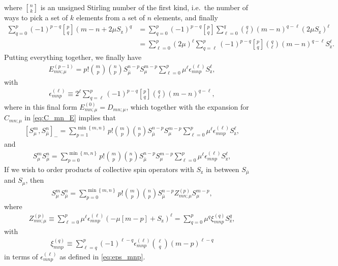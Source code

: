\documentclass[aps,notitlepage,nofootinbib,11pt]{revtex4-1}
\newcommand{\p}[1]{\left(#1\right)} %
\renewcommand{\sp}[1]{\left[#1\right]} %
\renewcommand{\set}[1]{\left\{#1\right\}} %
\newcommand{\z}{\text{z}}
\newcommand{\bmu}{{\bar\mu}}
\newcommand{\1}{\mathds{1}}
\begin{document}
where ${ n \brack k }$ is an unsigned Stirling number of the first
kind, i.e.~the number of ways to pick a set of $k$ elements from a set
of $n$ elements, and finally
\begin{align}
  \sum_{q=0}^p \p{-1}^{p-q} { p \brack q } \p{m-n+2\mu S_\z}^q
  &= \sum_{q=0}^p \p{-1}^{p-q} { p \brack q } \sum_{\ell=0}^q
  { q \choose \ell } \p{m-n}^{q-\ell} \p{2\mu S_\z}^\ell \\
  &= \sum_{\ell=0}^p \p{2\mu}^\ell \sum_{q=\ell}^p \p{-1}^{p-q}
  { p \brack q } { q \choose \ell } \p{m-n}^{q-\ell} S_\z^\ell.
\end{align}
Putting everything together, we finally have
\begin{align}
  E_{mn;\mu}^{(p-1)}
  = p! { m \choose p } { n \choose p }
  S_\bmu^{n-p} S_\mu^{m-p} \sum_{\ell=0}^p
  \mu^\ell \epsilon_{mnp}^{(\ell)} S_\z^\ell,
\end{align}
with
\begin{align}
  \epsilon_{mnp}^{(\ell)}
  \equiv 2^\ell \sum_{q=\ell}^p \p{-1}^{p-q}
  { p \brack q } { q \choose \ell } \p{m-n}^{q-\ell},
  \label{eq:eps_mnp}
\end{align}
where in this final form $E_{mn;\mu}^{(0)} = D_{mn;\mu}$, which
together with the expansion for $C_{mn;\mu}$ in \eqref{eq:C_mn_E}
implies that
\begin{align}
  \sp{S_\mu^m, S_\bmu^n}_-
  = \sum_{p=1}^{\min\set{m,n}}
  p! { m \choose p } { n \choose p } S_\bmu^{n-p} S_\mu^{m-p}
  \sum_{\ell=0}^p \mu^\ell \epsilon_{mnp}^{(\ell)} S_\z^\ell,
  \label{eq:comm_mu}
\end{align}
and
\begin{align}
  S_\mu^m S_\bmu^n
  = \sum_{p=0}^{\min\set{m,n}}
  p! { m \choose p } { n \choose p } S_\bmu^{n-p} S_\mu^{m-p}
  \sum_{\ell=0}^p \mu^\ell \epsilon_{mnp}^{(\ell)} S_\z^\ell,
  \label{eq:push_mu_bmu}
\end{align}
If we wish to order products of collective spin operators with $S_\z$
in between $S_\bmu$ and $S_\mu$, then
\begin{align}
  S_\mu^m S_\bmu^n
  = \sum_{p=0}^{\min\set{m,n}} p! { m \choose p } { n \choose p }
  S_\bmu^{n-p} Z_{mn;\mu}^{(p)} S_\mu^{m-p},
\end{align}
where
\begin{align}
  Z_{mn;\mu}^{(p)}
  \equiv \sum_{\ell=0}^p \mu^\ell \epsilon_{mnp}^{(\ell)}
  \p{-\mu\sp{m-p} + S_\z}^\ell
  = \sum_{q=0}^p \mu^q \xi_{mnp}^{(q)} S_\z^q,
  \label{eq:Z_mn}
\end{align}
with
\begin{align}
  \xi_{mnp}^{(q)}
  \equiv \sum_{\ell=q}^p \p{-1}^{\ell-q}
  \epsilon_{mnp}^{(\ell)} { \ell \choose q } \p{m-p}^{\ell-q}
  \label{eq:xi_mnp}
\end{align}
in terms of $\epsilon_{mnp}^{(\ell)}$ as defined in
\eqref{eq:eps_mnp}.
\end{document}
